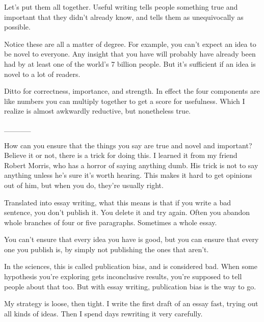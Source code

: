 Let's put them all together. Useful
                  writing tells people something true and important that they
                  didn't already know, and tells them as unequivocally as
                  possible.

Notice these are all a matter of degree.
                  For example, you can't expect an idea to be novel to everyone.
                  Any insight that you have will probably have already been had
                  by at least one of the world's 7 billion people. But it's
                  sufficient if an idea is novel to a lot of readers.

Ditto
                  for correctness, importance, and strength. In effect the four
                  components are like numbers you can multiply together to get a
                  score for usefulness. Which I realize is almost awkwardly
                  reductive, but nonetheless true.


                  \_\_\_\_\_
                  


                  How can you ensure that the things you say are true and novel
                  and important? Believe it or not, there is a trick for doing
                  this. I learned it from my friend Robert Morris, who has a
                  horror of saying anything dumb. His trick is not to say
                  anything unless he's sure it's worth hearing. This makes it
                  hard to get opinions out of him, but when you do, they're
                  usually right.

Translated into essay writing, what
                  this means is that if you write a bad sentence, you don't
                  publish it. You delete it and try again. Often you abandon
                  whole branches of four or five paragraphs. Sometimes a whole
                  essay.

You can't ensure that every idea you have is
                  good, but you can ensure that every one you publish is, by
                  simply not publishing the ones that aren't.

In the
                  sciences, this is called publication bias, and is considered
                  bad. When some hypothesis you're exploring gets inconclusive
                  results, you're supposed to tell people about that too. But
                  with essay writing, publication bias is the way to go.

My
                  strategy is loose, then tight. I write the first draft of an
                  essay fast, trying out all kinds of ideas. Then I spend days
                  rewriting it very carefully.

